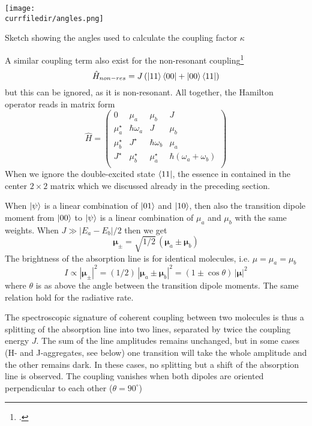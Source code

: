 \begin{marginfigure}
\texttt{[image: \\currfiledir/angles.png]}
\caption{Sketch showing 
the angles used to calculate the coupling factor $\kappa$}
\end{marginfigure}

A similar coupling term also exist for the non-resonant coupling\footcite{knoester-book}
\[
\hat{H}_{non-res} = J \left(  \ket{11}\bra{00} + \ket{00}\bra{11}  \right)
\]
but this can be ignored, as it is non-resonant. All together, the Hamilton operator reads in matrix form
\[
\hat{H} = \begin{pmatrix}
0   					& \mu_a 						&	\mu_b						& 		J 		\\
\mu_a^\star	& \hbar \omega_a		&	J								& \mu_b	\\
\mu_b^\star  &  J^\star					& \hbar \omega_b		& \mu_a	\\
J^\star				& \mu_b^\star			& \mu_a^\star			& \hbar (\omega_a + \omega_b) \\
\end{pmatrix}
\]
When we ignore the double-excited state $\bra{11}$, the essence in contained in the center $2 \times 2$ matrix which we discussed already in the preceding section.

When $\ket{\psi}$ is a linear combination of $\ket{01}$ and $\ket{10}$, then also the transition dipole moment from $\ket{00}$ to $\ket{\psi}$ is a linear combination of $\mu_a$ and $\mu_b$ with the same weights. When $J \gg |E_a - E_b| / 2$ then we get
\[
 \boldsymbol{\mu}_{\pm} = \sqrt{1/2} \, \left( \boldsymbol{\mu}_a \pm  \boldsymbol{\mu}_b  \right) 
\]
The brightness of the absorption line is for identical molecules, i.e. $\mu = \mu_a = \mu_b$
\[
 I \propto |\boldsymbol{\mu}_{\pm}|^2 = (1/2) \, \left| \boldsymbol{\mu}_a \pm  \boldsymbol{\mu}_b  \right|^2 =  \left( 1 \pm \cos \theta \right) \, \left| \boldsymbol{\mu}   \right| ^2 
\]
where $\theta$ is as above the angle between the transition dipole moments. The same relation hold for the radiative rate.

The spectroscopic signature of coherent coupling between two molecules is thus a splitting of the absorption line into two lines, separated by twice the coupling energy $J$. The sum of the line amplitudes remains unchanged, but in some cases (H- and J-aggregates, see below) one transition will take the whole amplitude and the other remains dark. In these cases, no splitting but a shift of the absorption line is observed. The coupling vanishes when both dipoles are oriented perpendicular to each other ($\theta = 90^\circ$)


